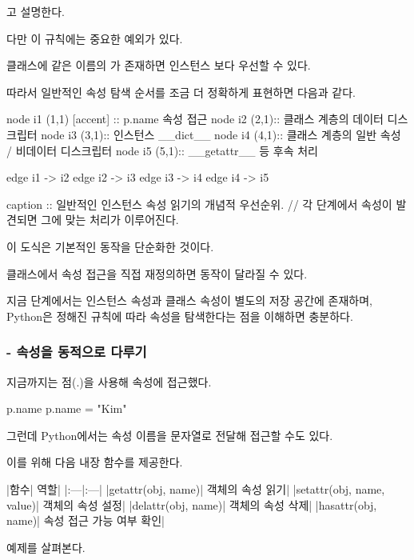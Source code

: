 고 설명한다.

다만 이 규칙에는 중요한 예외가 있다.

클래스에 같은 이름의 가 존재하면 인스턴스 보다 우선할 수 있다.

따라서 일반적인 속성 탐색 순서를 조금 더 정확하게 표현하면 다음과 같다.

\begin{dhkgraph}[uniform]
node i1 (1,1) [accent] :: p.name 속성 접근
node i2 (2,1):: 클래스 계층의 데이터 디스크립터
node i3 (3,1):: 인스턴스 __dict__
node i4 (4,1):: 클래스 계층의 일반 속성 / 비데이터 디스크립터
node i5 (5,1):: __getattr__ 등 후속 처리

edge i1 -> i2
edge i2 -> i3
edge i3 -> i4
edge i4 -> i5

caption :: 일반적인 인스턴스 속성 읽기의 개념적 우선순위. // 각 단계에서 속성이 발견되면 그에 맞는 처리가 이루어진다.
\end{dhkgraph}

이 도식은 기본적인  동작을 단순화한 것이다.

클래스에서 속성 접근을 직접 재정의하면 동작이 달라질 수 있다.

지금 단계에서는 인스턴스 속성과 클래스 속성이 별도의 저장 공간에 존재하며, Python은 정해진 규칙에 따라 속성을 탐색한다는 점을 이해하면 충분하다.

\subsubsection{ - 속성을 동적으로 다루기}

지금까지는 점(.)을 사용해 속성에 접근했다.

\begin{dhkcode}
p.name
p.name = "Kim"
\end{dhkcode}

그런데 Python에서는 속성 이름을 문자열로 전달해 접근할 수도 있다.

이를 위해 다음 내장 함수를 제공한다.

\begin{dhktable}
|함수|	역할|
|:---|:---|
|getattr(obj, name)|	객체의 속성 읽기|
|setattr(obj, name, value)|	객체의 속성 설정|
|delattr(obj, name)|	객체의 속성 삭제|
|hasattr(obj, name)|	속성 접근 가능 여부 확인|
\end{dhktable}

예제를 살펴본다.

